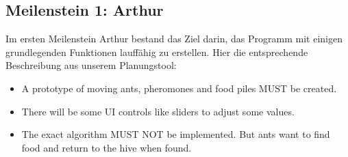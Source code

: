 \subsection{Meilenstein 1: Arthur}


Im ersten Meilenstein Arthur bestand das Ziel darin, das Programm mit einigen grundlegenden Funktionen lauffähig zu erstellen. Hier die entsprechende Beschreibung aus unserem Planungstool:

\begin{itemize}[noitemsep]
\item A prototype of moving ants, pheromones and food piles MUST be created.
\item There will be some UI controls like sliders to adjust some values.
\item The exact algorithm MUST NOT be implemented. But ants want to find food and return to the hive when found. \\\\
\end{itemize}




